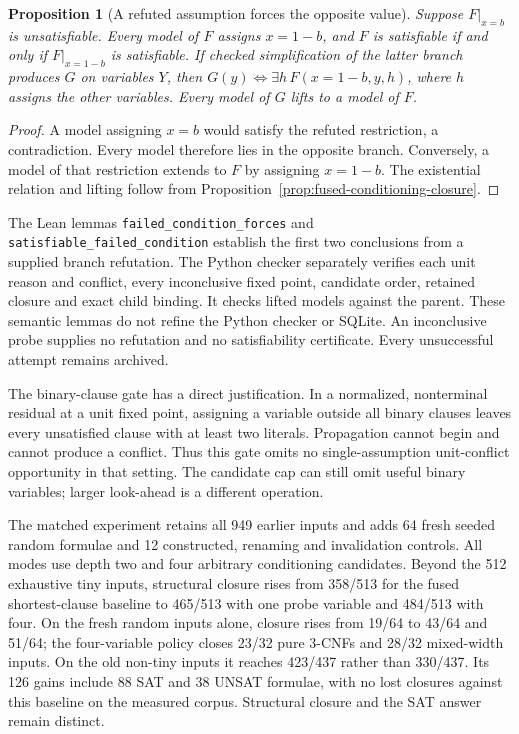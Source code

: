 \documentclass[11pt,a4paper]{article}
\numberwithin{equation}{section}
\theoremstyle{plain}
\newtheorem{proposition}[lemma]{Proposition}
\theoremstyle{definition}
\theoremstyle{remark}
\begin{document}
\begin{proposition}[A refuted assumption forces the opposite value]
\label{prop:failed-literal-reduction}
Suppose $F\vert_{x=b}$ is unsatisfiable. Every model of $F$ assigns $x=1-b$, and $F$ is satisfiable if and only if $F\vert_{x=1-b}$ is satisfiable. If checked simplification of the latter branch produces $G$ on variables $Y$, then $G(y)\Longleftrightarrow\exists h\,F(x=1-b,y,h)$, where $h$ assigns the other variables. Every model of $G$ lifts to a model of $F$.
\end{proposition}
\begin{proof}
A model assigning $x=b$ would satisfy the refuted restriction, a contradiction. Every model therefore lies in the opposite branch. Conversely, a model of that restriction extends to $F$ by assigning $x=1-b$. The existential relation and lifting follow from Proposition~\ref{prop:fused-conditioning-closure}.
\end{proof}

The Lean lemmas \texttt{failed\_condition\_forces} and \texttt{satisfiable\_failed\_condition} establish the first two conclusions from a supplied branch refutation. The Python checker separately verifies each unit reason and conflict, every inconclusive fixed point, candidate order, retained closure and exact child binding. It checks lifted models against the parent. These semantic lemmas do not refine the Python checker or SQLite. An inconclusive probe supplies no refutation and no satisfiability certificate. Every unsuccessful attempt remains archived.

The binary-clause gate has a direct justification. In a normalized, nonterminal residual at a unit fixed point, assigning a variable outside all binary clauses leaves every unsatisfied clause with at least two literals. Propagation cannot begin and cannot produce a conflict. Thus this gate omits no single-assumption unit-conflict opportunity in that setting. The candidate cap can still omit useful binary variables; larger look-ahead is a different operation.

The matched experiment retains all 949 earlier inputs and adds 64 fresh seeded random formulae and 12 constructed, renaming and invalidation controls. All modes use depth two and four arbitrary conditioning candidates. Beyond the 512 exhaustive tiny inputs, structural closure rises from 358/513 for the fused shortest-clause baseline to 465/513 with one probe variable and 484/513 with four. On the fresh random inputs alone, closure rises from 19/64 to 43/64 and 51/64; the four-variable policy closes 23/32 pure 3-CNFs and 28/32 mixed-width inputs. On the old non-tiny inputs it reaches 423/437 rather than 330/437. Its 126 gains include 88 SAT and 38 UNSAT formulae, with no lost closures against this baseline on the measured corpus. Structural closure and the SAT answer remain distinct.
\end{document}
